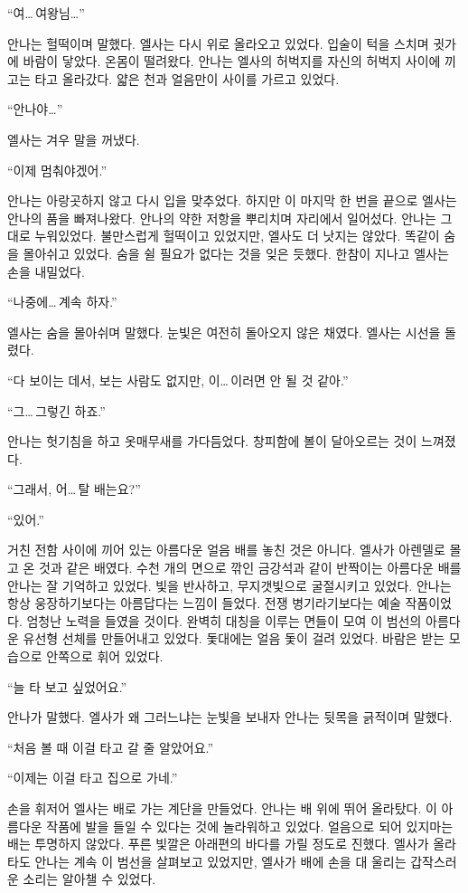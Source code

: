 ``여\ldots\,여왕님\ldots''

안나는 헐떡이며 말했다. 엘사는 다시 위로 올라오고 있었다. 입술이 턱을 스치며 귓가에 바람이 닿았다. 온몸이 떨려왔다. 안나는 엘사의 허벅지를 자신의 허벅지 사이에 끼고는 타고 올라갔다. 얇은 천과 얼음만이 사이를 가르고 있었다.

``안나야\ldots''

엘사는 겨우 말을 꺼냈다.

``이제 멈춰야겠어.''

안나는 아랑곳하지 않고 다시 입을 맞추었다. 하지만 이 마지막 한 번을 끝으로 엘사는 안나의 품을 빠져나왔다. 안나의 약한 저항을 뿌리치며 자리에서 일어섰다. 안나는 그대로 누워있었다. 불만스럽게 헐떡이고 있었지만, 엘사도 더 낫지는 않았다. 똑같이 숨을 몰아쉬고 있었다. 숨을 쉴 필요가 없다는 것을 잊은 듯했다. 한참이 지나고 엘사는 손을 내밀었다.

``나중에\ldots\,계속 하자.''

엘사는 숨을 몰아쉬며 말했다. 눈빛은 여전히 돌아오지 않은 채였다. 엘사는 시선을 돌렸다.

``다 보이는 데서, 보는 사람도 없지만, 이\ldots\,이러면 안 될 것 같아.''

``그\ldots\,그렇긴 하죠.''

안나는 헛기침을 하고 옷매무새를 가다듬었다. 창피함에 볼이 달아오르는 것이 느껴졌다.

``그래서, 어\ldots\,탈 배는요?''

`` 있어.''

거친 전함 사이에 끼어 있는 아름다운 얼음 배를 놓친 것은 아니다. 엘사가 아렌델로 몰고 온 것과 같은 배였다. 수천 개의 면으로 깎인 금강석과 같이 반짝이는 아름다운 배를 안나는 잘 기억하고 있었다. 빛을 반사하고, 무지갯빛으로 굴절시키고 있었다. 안나는 항상 웅장하기보다는 아름답다는 느낌이 들었다. 전쟁 병기라기보다는 예술 작품이었다. 엄청난 노력을 들였을 것이다. 완벽히 대칭을 이루는 면들이 모여 이 범선의 아름다운 유선형 선체를 만들어내고 있었다. 돛대에는 얼음 돛이 걸려 있었다. 바람은 받는 모습으로 안쪽으로 휘어 있었다.

``늘 타 보고 싶었어요.''

안나가 말했다. 엘사가 왜 그러느냐는 눈빛을 보내자 안나는 뒷목을 긁적이며 말했다.

``처음 볼 때 이걸 타고 갈 줄 알았어요.''

``이제는 이걸 타고 집으로 가네.''

손을 휘저어 엘사는 배로 가는 계단을 만들었다. 안나는 배 위에 뛰어 올라탔다. 이 아름다운 작품에 발을 들일 수 있다는 것에 놀라워하고 있었다. 얼음으로 되어 있지마는 배는 투명하지 않았다. 푸른 빛깔은 아래편의 바다를 가릴 정도로 진했다. 엘사가 올라타도 안나는 계속 이 범선을 살펴보고 있었지만, 엘사가 배에 손을 대 울리는 갑작스러운 소리는 알아챌 수 있었다.

